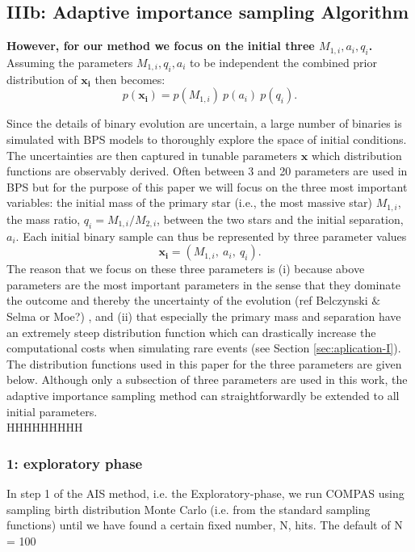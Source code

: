 \documentclass[a4paper,fleqn,usenatbib]{mnras}
\newcommand{\floor}[1]{\textbf{\textcolor{ochre}{#1}}}
\begin{document}
\subsection{IIIb: Adaptive importance sampling Algorithm}
\label{subsec:AISalgorithm}
%
\floor{However, for our method we focus on the initial three $ M_{1,i}, a_i, q_i$. }
Assuming the parameters $M_{1,i}, q_i, a_i$ to be independent the combined prior distribution of $\mathbf{x_i}$ then becomes:
%
\begin{equation}
	p(\mathbf{x_i}) = p({M_{1,i}}) \ p({a_i}) \  p({q_i})  .
	\label{eq:prior-3d}
\end{equation} 



Since the details of binary evolution are uncertain, a large number of binaries is simulated with BPS models to thoroughly explore the space of initial conditions. The uncertainties are then captured in tunable parameters $\mathbf{x}$  which distribution functions are observably derived. Often between 3 and 20 parameters are used in BPS but for the purpose of this paper we will focus on the three most important variables: the initial mass of the primary star (i.e., the most massive star) $M_{1,i}$, the mass ratio, $q_i = M_{1,i} / M_{2,i}$, between the two stars and  the initial separation, $a_i$. Each initial binary sample can thus be represented by three parameter values
%
\begin{equation}
	\mathbf{x_i} = (M_{1,i},\ a_i, \ q_i). 
\end{equation}
%
The reason that we focus on these three parameters is (i) because above parameters are the most important  parameters in the sense that they dominate the outcome and thereby the uncertainty of the evolution (ref Belczynski $\&$ Selma or Moe?) , and (ii) that especially the primary mass and separation have an extremely steep distribution function which can drastically increase the computational costs when simulating rare events (see Section \ref{sec:aplication-I}).  The distribution functions used in this paper for the three parameters are given below. 
Although only a subsection of three parameters are used in this work,   the adaptive importance sampling method can straightforwardly be extended to all initial parameters. \\

HHHHHHHHH \\

\subsubsection{1: exploratory phase}
In step 1 of the AIS method, i.e. the Exploratory-phase,  we run COMPAS using sampling birth distribution Monte Carlo (i.e. from the standard sampling functions) until we have found a certain fixed number, N,  hits. The default of N = 100
\end{document}
